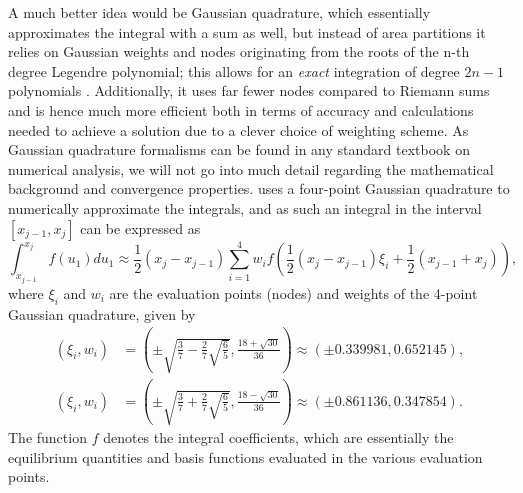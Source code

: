 A much better idea would be Gaussian quadrature, which essentially approximates the integral with a sum as well, but instead of area partitions it relies on Gaussian weights and nodes originating from the roots of the n-th degree Legendre polynomial; this allows for an \emph{exact} integration of degree $2n - 1$ polynomials \citep{book_MHD}. Additionally, it uses far fewer nodes compared to Riemann sums and is hence much more efficient both in terms of accuracy and calculations needed to achieve a solution due to a clever choice of weighting scheme. As Gaussian quadrature formalisms can be found in any standard textbook on numerical analysis, we will not go into much detail regarding the mathematical background and convergence properties. {\legolas} uses a four-point Gaussian quadrature to numerically approximate the integrals, and as such an integral in the interval $[x_{j-1}, x_j]$ can be expressed as
\begin{equation}
  \int_{x_{j-1}}^{x_j} f(u_1)du_1 \approx
    \frac{1}{2}\left(x_j - x_{j-1}\right)\sum_{i=1}^4 w_i f\left(
     \frac{1}{2}\left(x_j - x_{j-1}\right)\xi_i + \frac{1}{2}\left(x_{j-1} + x_j\right)
    \right),
\end{equation}
where $\xi_i$ and $w_i$ are the evaluation points (nodes) and weights of the 4-point Gaussian quadrature, given by
\begin{equation} \label{eq: gaussian_nodes}
  \begin{aligned}
    \left(\xi_i, w_i\right) &= \left(
      \pm \sqrt{\frac{3}{7} - \frac{2}{7}\sqrt{\frac{6}{5}}}, \frac{18 + \sqrt{30}}{36}
    \right)
    \approx (\pm 0.339981, 0.652145), \\
    \left(\xi_i, w_i\right) &= \left(
      \pm \sqrt{\frac{3}{7} + \frac{2}{7}\sqrt{\frac{6}{5}}}, \frac{18 - \sqrt{30}}{36}
    \right)
    \approx (\pm 0.861136, 0.347854).
  \end{aligned}
\end{equation}
The function $f$ denotes the integral coefficients, which are essentially the equilibrium quantities and basis functions evaluated in the various evaluation points.

